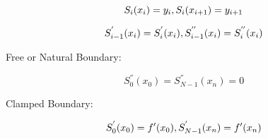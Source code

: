 \documentclass[12pt]{article}
\newcommand{\1}{\mathbbm 1}
\begin{document}
		
		
		
		\begin{equation}
			S_{i}(x_{i}) = y_{i}, \\ S_{i}(x_{i+1}) = y_{i+1}
		\end{equation}
		
		\begin{equation}
			S_{i-1}^{'}(x_{i}) = S_{i}^{'}(x_{i}), \\ S_{i-1}^{''}(x_{i}) = S_{i}^{''}(x_{i})
		\end{equation}
		
		
		Free or Natural Boundary: 
		
		\begin{equation}
			S_{0}^{''}(x_{0}) = S_{N-1}^{''}(x_{n}) = 0
		\end{equation}
		
		Clamped Boundary:  
		
		\begin{equation}
			S_{0}^{'}(x_{0}) = f'(x_{0}), \\ S_{N-1}^{'}(x_{n}) = f'(x_{n})
		\end{equation}
		
		
\end{document}

